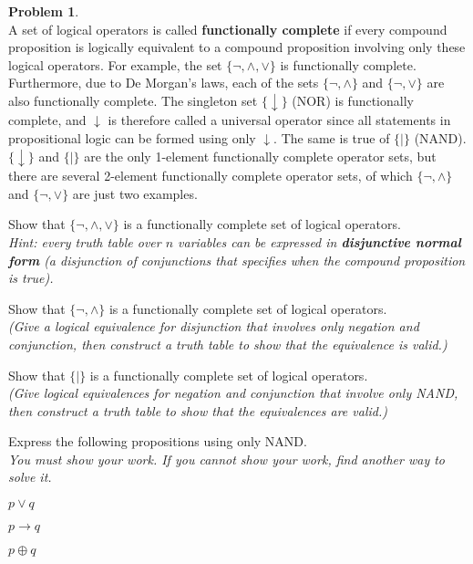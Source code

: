 \documentclass{article}
\theoremstyle{definition}
\newtheorem{problem}{Problem}
\newtheorem*{solution}{Solution}
\begin{document}
\begin{problem}\ \\
A set of logical operators is called {\bf functionally complete} if every compound proposition is logically equivalent to a compound proposition involving only these logical operators.  For example, the set $\{\neg,\wedge,\vee\}$ is functionally complete.  Furthermore, due to De Morgan's laws, each of the sets $\{\neg,\wedge\}$ and $\{\neg,\vee\}$ are also functionally complete.  The singleton set $\{\downarrow\}$ (NOR) is functionally complete, and $\downarrow$ is therefore called a universal operator since all statements in propositional logic can be formed using only $\downarrow$.  The same is true of $\{\mid\}$ (NAND).  $\{\downarrow\}$ and $\{\mid\}$ are the only 1-element functionally complete operator sets, but there are several 2-element functionally complete operator sets, of which $\{\neg,\wedge\}$ and $\{\neg,\vee\}$ are just two examples.
\begin{compactenum}
\item Show that $\{\neg,\wedge,\vee\}$ is a functionally complete set of logical operators.\\
\textit{Hint: every truth table over $n$ variables can be expressed in \textbf{disjunctive normal form} (a disjunction of conjunctions that specifies when the compound proposition is true).}
\item Show that $\{\neg,\wedge\}$ is a functionally complete set of logical operators.\\
\textit{(Give a logical equivalence for disjunction that involves only negation and conjunction, then construct a truth table to show that the equivalence is valid.)}
\item Show that $\{\mid\}$ is a functionally complete set of logical operators.\\
\textit{(Give logical equivalences for negation and conjunction that involve only NAND, then construct a truth table to show that the equivalences are valid.)}
\item Express the following propositions using only NAND.\\
\textit{You must show your work.  If you cannot show your work, find another way to solve it.}
\begin{compactenum}
\item $p \vee q$
\item $p \to q$
\item $p \oplus q$
\end{compactenum}
\end{compactenum}
\end{problem}

\end{document}
